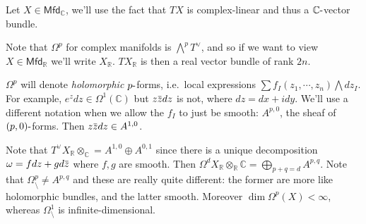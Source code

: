 Let \(X \in {\mathsf{Mfd}}_{\mathbb{C}}\), we'll use the fact that
\(TX\) is complex-linear and thus a \({\mathbb{C}}{\hbox{-}}\)vector
bundle.

\begin{figure}
\centering
{}
\end{figure}

\begin{remark}[Subtlety 1]

Note that \(\Omega^p\) for complex manifolds is \(\bigwedge^p T^\vee\),
and so if we want to view \(X \in {\mathsf{Mfd}}_{\mathbb{R}}\) we'll
write \(X_{{\mathbb{R}}}\). \(TX_{\mathbb{R}}\) is then a real vector
bundle of rank \(2n\).

\end{remark}

\begin{remark}[Subtlety 2]

\(\Omega^p\) will denote \emph{holomorphic} \(p{\hbox{-}}\)forms,
i.e.~local expressions \(\sum f_I(z_1, \cdots, z_n) \bigwedge dz_I\).
For example, \(e^zdz\in \Omega^1({\mathbb{C}})\) but
\(z\mkern 1.5mu\overline{\mkern-1.5muz\mkern-1.5mu}\mkern 1.5mu dz\) is
not, where \(dz = dx + idy\). We'll use a different notation when we
allow the \(f_I\) to just be smooth: \(A^{p, 0}\), the sheaf of
\((p, 0){\hbox{-}}\)forms. Then
\(z\mkern 1.5mu\overline{\mkern-1.5muz\mkern-1.5mu}\mkern 1.5mu dz\in A^{1, 0}\).

\end{remark}

\begin{remark}

Note that
\(T^\vee X_{\mathbb{R}}\otimes _{\mathbb{C}}= A^{1, 0} \oplus A^{0, 1}\)
since there is a unique decomposition
\(\omega = fdz + gd\mkern 1.5mu\overline{\mkern-1.5muz\mkern-1.5mu}\mkern 1.5mu\)
where \(f,g\) are smooth. Then
\(\Omega^d X_{\mathbb{R}}\otimes_{\mathbb{R}}{\mathbb{C}}= \bigoplus _{p+q=d} A^{p, q}\).
Note that \(\Omega_{\setminus}^p \neq A^{p, q}\) and these are really
quite different: the former are more like holomorphic bundles, and the
latter smooth. Moreover \(\dim \Omega^p(X) < \infty\), whereas
\(\Omega_{\setminus}^1\) is infinite-dimensional.

\end{remark}

